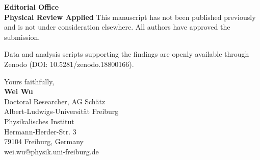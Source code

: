 \documentclass{letter}
\begin{document}
\begin{letter}{\textbf{Editorial Office}\\ 
		\textbf{Physical Review Applied}}
This manuscript has not been published previously and is not under consideration elsewhere. All authors have approved the submission.

Data and analysis scripts supporting the findings are openly available through Zenodo (DOI: 10.5281/zenodo.18800166).

Yours faithfully,\\

{\bf Wei Wu}\\
Doctoral Researcher, AG Sch\"{a}tz\\
Albert-Ludwigs-Universität Freiburg\\
Physikalisches Institut\\
Hermann-Herder-Str. 3\\
79104 Freiburg, Germany\\
wei.wu@physik.uni-freiburg.de
\end{letter}
\end{document}
